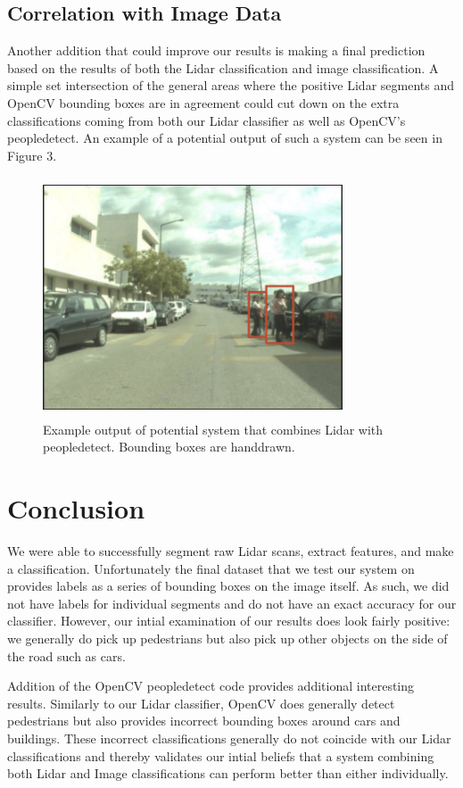 \documentclass[10pt,twocolumn,letterpaper]{article}
\begin{document}
  \subsection{Correlation with Image Data}
  Another addition that could improve our results is making a final prediction based
  on the results of both the Lidar classification and image classification. A simple
  set intersection of the general areas where the positive Lidar segments and OpenCV
  bounding boxes are in agreement could cut down on the extra classifications coming from
  both our Lidar classifier as well as OpenCV's peopledetect. An example of a potential
  output of such a system can be seen in Figure 3.

  \begin{figure}
    \includegraphics[height=2.8in, width=3.5in]{images/futureWork.png}
    \caption{ Example output of potential system that combines Lidar with peopledetect.
    Bounding boxes are handdrawn. }
  \end{figure}

\section{Conclusion}
  We were able to successfully segment raw Lidar scans, extract
  features, and make a classification. Unfortunately the final dataset that
  we test our system on provides labels as a series of bounding boxes on the
  image itself. As such, we did not have labels for individual segments and do
  not have an exact accuracy for our classifier. However, our intial examination
  of our results does look fairly positive: we generally do pick up pedestrians
  but also pick up other objects on the side of the road such as cars.

  Addition of the OpenCV peopledetect code provides additional interesting
  results. Similarly to our Lidar classifier, OpenCV does generally detect
  pedestrians but also provides incorrect bounding boxes around cars and buildings.
  These incorrect classifications generally do not coincide with our Lidar
  classifications and thereby validates our intial beliefs that a system combining
  both Lidar and Image classifications can perform better than either individually.


{\small


}
\end{document}

